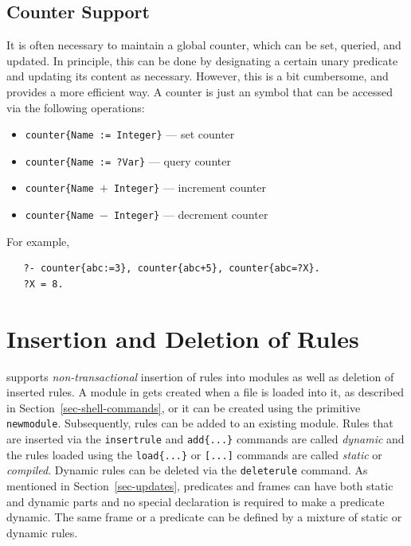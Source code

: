 \documentclass[11pt]{article}
\newcommand{\ERGO}{\mbox{\smaller{\ensuremath{\cal{E}}\smaller{{\sc{RGO}}}}}\xspace}
\newcommand{\FLSYSTEM}{\ERGO}
\begin{document}



\subsection{Counter Support}

It is often necessary to maintain a global counter, which can be set,
queried, and updated. In principle, this can be done
by designating a certain unary predicate and updating its content as necessary.
However, this is a bit cumbersome, and \FLSYSTEM provides a more efficient
way. A counter is just an \FLSYSTEM symbol that can be accessed via the
following operations:

\begin{itemize}
\item \texttt{counter\{Name := Integer\}} --- set counter
\item \texttt{counter\{Name := ?Var\}} --- query counter
\item \texttt{counter\{Name $+$ Integer\}} --- increment counter
\item \texttt{counter\{Name $-$ Integer\}} --- decrement counter
\end{itemize}
For example,
\begin{verbatim}
   ?- counter{abc:=3}, counter{abc+5}, counter{abc=?X}.
   ?X = 8.
\end{verbatim}



\section{Insertion and Deletion of Rules}
\label{sec-rule-update}

\FLSYSTEM supports \emph{non-transactional} insertion of rules into modules as
well as deletion of inserted rules.  A module in \FLSYSTEM gets created when a
file is loaded into it, as described in
Section~\ref{sec-shell-commands}, or it can be created using the primitive
{\tt newmodule}. Subsequently, rules can be added to an existing module.
Rules that are inserted via the {\tt insertrule} and {\tt add\{...\}} commands
are called \emph{dynamic} and the rules loaded using the {\tt load\{...\}} or
{\tt [...]} commands are called \emph{static} or \emph{compiled}.  Dynamic
rules can be deleted via the {\tt deleterule} command. As mentioned in
Section~\ref{sec-updates}, \FLSYSTEM predicates and frames can have both
static and dynamic parts and no special declaration is required to make a
predicate dynamic. The same frame or a predicate can be defined by a
mixture of static or dynamic rules.
\end{document}
